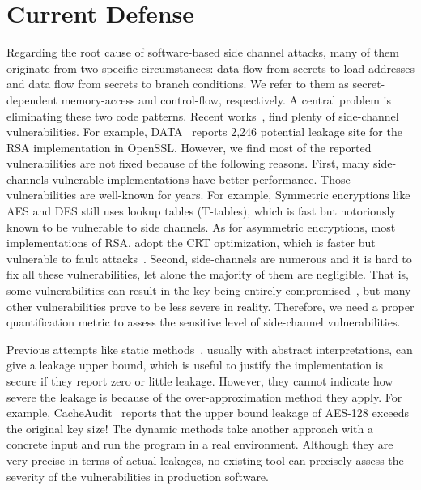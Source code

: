\section{Current Defense}

Regarding the root cause of software-based side channel attacks, many of them originate
from two specific circumstances: data flow from secrets to load
addresses and data flow from secrets to branch conditions. We refer to them as
 secret-dependent memory-access and control-flow, respectively. A
central problem is eliminating these two code patterns. 
Recent
works~\cite{203878,217537,Wichelmann:2018:MFF:3274694.3274741,Brotzman19Casym,236338,182946},
find plenty of side-channel vulnerabilities. For example,
DATA~\cite{217537} reports 2,246 potential leakage site for the RSA
implementation in OpenSSL\@. 
However, we find most of the reported vulnerabilities are not fixed because
of the following reasons.
First, many side-channels vulnerable implementations have better performance.
Those vulnerabilities are well-known for years. For example,
Symmetric encryptions like AES and DES still uses lookup tables (T-tables), which
is fast but notoriously known to be vulnerable to side channels.
As for asymmetric encryptions, most implementations of RSA, adopt the CRT optimization,
which is faster but vulnerable to fault attacks~\cite{aumuller2002fault}.
Second, side-channels are numerous and it is hard to fix all these vulnerabilities,
let alone the majority of them are negligible. 
That is, some vulnerabilities can result in the key being 
entirely compromised~\cite{184415, aumuller2002fault}, but many other vulnerabilities prove to be less
severe in reality. Therefore, we need a proper quantification metric to 
assess the sensitive level of side-channel vulnerabilities.

Previous attempts like static methods~\cite{182946,5207642}, usually with
abstract interpretations, can give a leakage upper bound, which is useful to
justify the implementation is secure if they report zero or little leakage.
However, they cannot indicate how severe the leakage is because of the
over-approximation method they apply. For example, CacheAudit~\cite{182946} reports that the upper
bound leakage of AES-128 exceeds the original key size! The dynamic methods take
another approach with a concrete input and run the program in a real
environment. Although they are very precise in terms of actual leakages, no
existing tool can precisely assess the severity of the vulnerabilities in production
software. 

